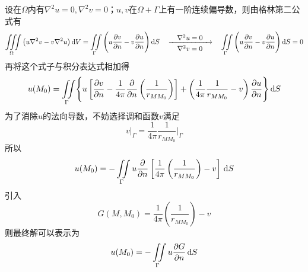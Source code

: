 设在$\Omega$内有$\nabla^2 u=0,\nabla^2 v = 0$；$u,v$在$\Omega + \Gamma$上有一阶连续偏导数，则由格林第二公式有
\begin{equation}
	\iiint\limits_{\Omega} \big(u \nabla^2 v - v \nabla^2 u\big)\, {\rm{d}} V = \iint\limits_{\Gamma} \Bigg(u\dfrac{\partial v}{\partial n} - v \dfrac{\partial u}{\partial n}\Bigg)\, {\rm{d}} S \quad \xrightarrow[\textstyle \nabla^2 v = 0]{\textstyle \quad \nabla^2 u = 0 \quad } \quad \iint \limits_{\Gamma}\Bigg(u\dfrac{\partial v}{\partial n} - v \dfrac{\partial u}{\partial n}\Bigg)\, {\rm{d}} S =  0
\end{equation}
再将这个式子与积分表达式相加得
\begin{equation}
	u(M_0) = \iint \limits_{\Gamma} \Biggl\{u\left[\dfrac{\partial v}{\partial n} - \dfrac{1}{4\pi}\dfrac{\partial }{\partial n}\left(\dfrac{1}{r_{MM_0}}\right)\right] + \left(\dfrac{1}{4\pi}\dfrac{1}{r_{MM_0}} - v\right)\dfrac{\partial u}{\partial n}\Biggr\}\, {\rm{d}} S
\end{equation}
为了消除$u$的法向导数，不妨选择调和函数$v$满足
\begin{equation}
	v\big|_\Gamma = \dfrac{1}{4\pi}\dfrac{1}{r_{MM_0}}\Bigg|_\Gamma
\end{equation}
所以
\begin{equation}
	u(M_0) = - \iint\limits_{\Gamma}u \dfrac{\partial }{\partial n}\left[\dfrac{1}{4\pi}\left(\dfrac{1}{r_{MM_0}}\right)-v\right]\, {\rm{d}} S
\end{equation}
引入
\begin{equation}
	G(M,M_0) = \dfrac{1}{4\pi } \left(\dfrac{1}{r_{MM_0}}\right) - v
\end{equation}
则最终解可以表示为
\begin{equation}
	u(M_0) = - \iint\limits_{\Gamma} u \dfrac{\partial G}{\partial n}\, {\rm{d}} S
\end{equation}

